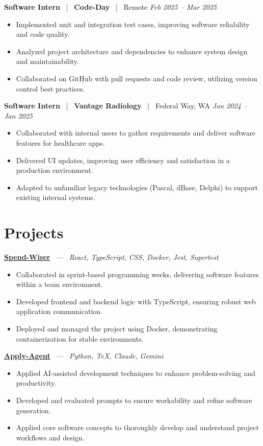 \documentclass[10pt, letterpaper]{article}
\newcommand{\jobhead}[4]{%
  \vspace{5pt}%
  {\bfseries\color{dark}#1}%
  ~{\color{light}|}~%
  {\bfseries\color{navy}#2}%
  ~{\color{light}|}~%
  {\color{light}#3}%
  \hfill{\color{light}\small\textit{#4}}\\[-2pt]%
}
\newcommand{\projhead}[3]{%
  \vspace{5pt}%
  {\bfseries\color{dark}\href{#2}{#1}}%
  ~{\color{light}---}~%
  {\color{light}\small\textit{#3}}\\[-2pt]%
}
\begin{document}
\jobhead{Software Intern}{Code-Day}{Remote}{Feb 2025 – Mar 2025}
\begin{itemize}
  \item Implemented unit and integration test cases, improving software reliability and code quality.
  \item Analyzed project architecture and dependencies to enhance system design and maintainability.
  \item Collaborated on GitHub with pull requests and code review, utilizing version control best practices.
\end{itemize}

\jobhead{Software Intern}{Vantage Radiology}{Federal Way, WA}{Jan 2024 – Jan 2025}
\begin{itemize}
  \item Collaborated with internal users to gather requirements and deliver software features for healthcare apps.
  \item Delivered UI updates, improving user efficiency and satisfaction in a production environment.
  \item Adapted to unfamiliar legacy technologies (Pascal, dBase, Delphi) to support existing internal systems.
\end{itemize}

\section{Projects}

\projhead{Spend-Wiser}{https://github.com/JesseChum/w26-sdev372-spendwiser-finance-tracker}{React, TypeScript, CSS, Docker, Jest, Supertest}
\begin{itemize}
  \item Collaborated in sprint-based programming weeks, delivering software features within a team environment.
  \item Developed frontend and backend logic with TypeScript, ensuring robust web application communication.
  \item Deployed and managed the project using Docker, demonstrating containerization for stable environments.
\end{itemize}

\projhead{Apply-Agent}{https://github.com/timmyd4/apply-agent}{Python, TeX, Claude, Gemini}
\begin{itemize}
  \item Applied AI-assisted development techniques to enhance problem-solving and productivity.
  \item Developed and evaluated prompts to ensure workability and refine software generation.
  \item Applied core software concepts to thoroughly develop and understand project workflows and design.
\end{itemize}
\end{document}
